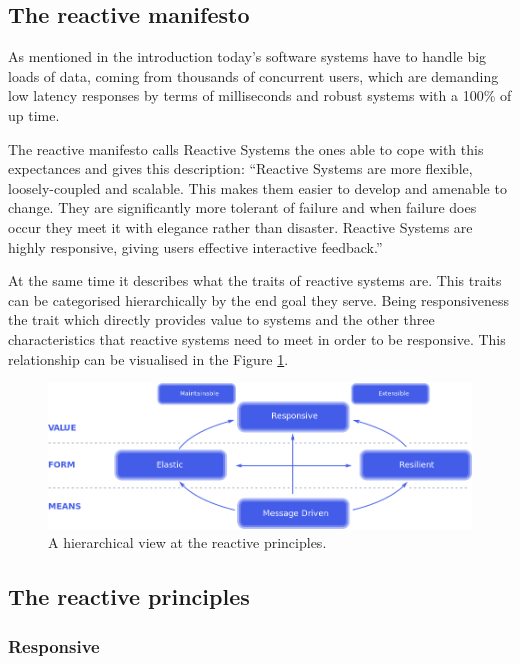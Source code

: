 \documentclass[../main.tex]{subfiles}
\begin{document}
\subsection{The reactive manifesto}

As mentioned in the introduction today's software systems have to handle big
loads of data, coming from thousands of concurrent users, which are demanding
low latency responses by terms of milliseconds and robust systems with a 100\%
of up time.

The reactive manifesto \autocite{2014TheManifesto} calls Reactive Systems the
ones able to cope with this expectances and gives this description: ``Reactive
Systems are more flexible, loosely-coupled and scalable. This makes them easier
to develop and amenable to change. They are significantly more tolerant of
failure and when failure does occur they meet it with elegance rather than
disaster. Reactive Systems are highly responsive, giving users effective
interactive feedback.''


At the same time it describes what the traits of reactive systems are. This
traits can be categorised hierarchically by the end goal they serve. Being
responsiveness the trait which directly provides value to systems and the other
three characteristics that reactive systems need to meet in order to be
responsive. This relationship can be visualised in the Figure
\ref{fig:reactive}.

\begin{figure}[ht] \centering
\includegraphics[width=\textwidth]{images/reactive-traits.png}
    \caption{A hierarchical view at the reactive principles.}
    \label{fig:reactive}
\end{figure}

\subsection{The reactive principles}
\subsubsection{Responsive}
\end{document}
